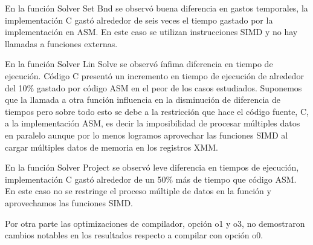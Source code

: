 \par En la función Solver Set Bnd se observó buena diferencia en gastos temporales, la implementación C gastó alrededor de seis veces el tiempo gastado por la implementación en ASM. En este caso se utilizan instrucciones SIMD y no hay llamadas a funciones  externas.
\par En la función Solver Lin Solve se observó ínfima diferencia en tiempo de ejecución. Código C presentó un incremento en tiempo de ejecución de alrededor del 10$\%$ gastado por código ASM en el peor de los casos estudiados. Suponemos que la llamada a otra función influencia en la disminución de diferencia de tiempos pero sobre todo esto se debe a la restricción que hace el código fuente, C, a la implementación ASM, es decir la imposibilidad de procesar múltiples datos en paralelo aunque por lo menos logramos aprovechar las funciones SIMD al cargar múltiples datos de memoria en los registros XMM. 
\par En la función Solver Project se observó leve diferencia en tiempos de ejecución, implementación C gastó alrededor de un 50$\%$ más de tiempo que código ASM. En este caso no se restringe el proceso múltiple de datos en la función y aprovechamos las funciones SIMD.
\par Por otra parte las optimizaciones de compilador, opción o1 y o3, no demostraron cambios notables en los resultados respecto a compilar con opción o0.
